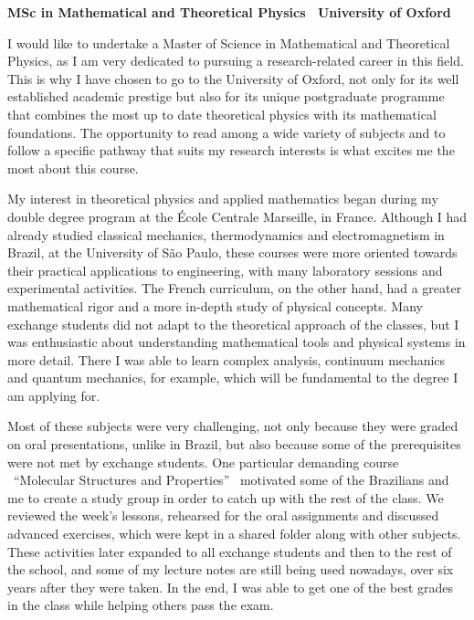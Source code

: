 \documentclass[11pt]{article}
\newcommand*{\NEWLINE}{\vspace{0.75em}}
\begin{document}
\sffamily %

{\bfseries MSc in Mathematical and Theoretical Physics \textemdash~University of Oxford}
\NEWLINE{}\NEWLINE{}


I would like to undertake a Master of Science in Mathematical and Theoretical Physics, as I am very dedicated to pursuing a research-related career in this field. This is why I have chosen to go to the University of Oxford, not only for its well established academic prestige but also for its unique postgraduate programme that combines the most up to date theoretical physics with its mathematical foundations. The opportunity to read among a wide variety of subjects and to follow a specific pathway that suits my research interests is what excites me the most about this course. \NEWLINE{}

My interest in theoretical physics and applied mathematics began during my double degree program at the École Centrale Marseille, in France. Although I had already studied classical mechanics, thermodynamics and electromagnetism in Brazil, at the University of São Paulo, these courses were more oriented towards their practical applications to engineering, with many laboratory sessions and experimental activities. The French curriculum, on the other hand, had a greater mathematical rigor and a more in-depth study of physical concepts. Many exchange students did not adapt to the theoretical approach of the classes, but I was enthusiastic about understanding mathematical tools and physical systems in more detail. There I was able to learn complex analysis, continuum mechanics and quantum mechanics, for example, which will be fundamental to the degree I am applying for. \NEWLINE{}

Most of these subjects were very challenging, not only because they were graded on oral presentations, unlike in Brazil, but also because some of the prerequisites were not met by exchange students. One particular demanding course \textemdash~``Molecular Structures and Properties'' \textemdash~motivated some of the Brazilians and me to create a study group in order to catch up with the rest of the class. We reviewed the week's lessons, rehearsed for the oral assignments and discussed advanced exercises, which were kept in a shared folder along with other subjects. These activities later expanded to all exchange students and then to the rest of the school, and some of my lecture notes are still being used nowadays, over six years after they were taken. In the end, I was able to get one of the best grades in the class while helping others pass the exam. \NEWLINE{}
\end{document}
